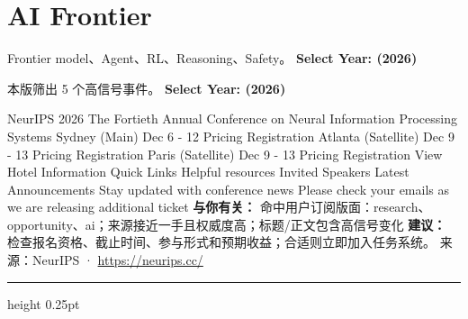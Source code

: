 \documentclass[10.5pt]{ctexart}
\begin{document}
\section*{AI Frontier}
{\color{ormuted} Frontier model、Agent、RL、Reasoning、Safety。}
\vspace{2mm}
{\LARGE\bfseries Select Year: (2026)}\par
\vspace{1mm}
{\color{ormuted} 本版筛出 5 个高信号事件。}
\vspace{3mm}
{\Large\bfseries Select Year: (2026)}\par
NeurIPS 2026 The Fortieth Annual Conference on Neural Information Processing Systems Sydney (Main) Dec 6 - 12 Pricing Registration Atlanta (Satellite) Dec 9 - 13 Pricing Registration Paris (Satellite) Dec 9 - 13 Pricing Registration View Hotel Information Quick Links Helpful resources Invited Speakers Latest Announcements Stay updated with conference news Please check your emails as we are releasing additional ticket
\textbf{与你有关：} 命中用户订阅版面：research、opportunity、ai；来源接近一手且权威度高；标题/正文包含高信号变化
\textbf{建议：} 检查报名资格、截止时间、参与形式和预期收益；合适则立即加入任务系统。
{\footnotesize\color{ormuted} 来源：NeurIPS · \url{https://neurips.cc/}}
\vspace{4mm}
\hrule height 0.25pt
\vspace{3mm}
\end{document}
